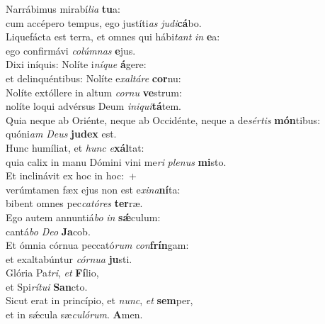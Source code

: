 \evenverse Narrábimus mirabí\textit{li}\textit{a} \textbf{tu}a:~\*\\
\evenverse cum accépero tempus, ego justíti\textit{as} \textit{ju}\textit{di}\textbf{cá}bo.\\
\oddverse Liquefácta est terra, et omnes qui hábi\textit{tant} \textit{in} \textbf{e}a:~\*\\
\oddverse ego confirmávi \textit{co}\textit{lúm}\textit{nas} \textbf{e}jus.\\
\evenverse Dixi iníquis: Nolíte i\textit{ní}\textit{que} \textbf{á}gere:~\*\\
\evenverse et delinquéntibus: Nolíte e\textit{xal}\textit{tá}\textit{re} \textbf{cor}nu:\\
\oddverse Nolíte extóllere in altum \textit{cor}\textit{nu} \textbf{ve}strum:~\*\\
\oddverse nolíte loqui advérsus Deum \textit{i}\textit{ni}\textit{qui}\textbf{tá}tem.\\
\evenverse Quia neque ab Oriénte, neque ab Occidénte, neque a de\textit{sér}\textit{tis} \textbf{món}tibus:~\*\\
\evenverse quóni\textit{am} \textit{De}\textit{us} \textbf{ju}\textbf{dex} est.\\
\oddverse Hunc humíliat, et \textit{hunc} \textit{e}\textbf{xál}tat:~\*\\
\oddverse quia calix in manu Dómini vini me\textit{ri} \textit{ple}\textit{nus} \textbf{mi}sto.\\
\evenverse Et inclinávit ex hoc in hoc:~+\\
\evenverse  verúmtamen fæx ejus non est e\textit{xi}\textit{na}\textbf{ní}ta:~\*\\
\evenverse bibent omnes pec\textit{ca}\textit{tó}\textit{res} \textbf{ter}ræ.\\
\oddverse Ego autem annuntiá\textit{bo} \textit{in} \textbf{sǽ}culum:~\*\\
\oddverse cantá\textit{bo} \textit{De}\textit{o} \textbf{Ja}cob.\\
\evenverse Et ómnia córnua peccató\textit{rum} \textit{con}\textbf{frín}gam:~\*\\
\evenverse et exaltabúntur \textit{cór}\textit{nu}\textit{a} \textbf{ju}sti.\\
\oddverse Glória Pa\textit{tri}, \textit{et} \textbf{Fí}lio,~\*\\
\oddverse et Spi\textit{rí}\textit{tu}\textit{i} \textbf{San}cto.\\
\evenverse Sicut erat in princípio, et \textit{nunc}, \textit{et} \textbf{sem}per,~\*\\
\evenverse et in sǽcula sæ\textit{cu}\textit{ló}\textit{rum}. \textbf{A}men.\\

